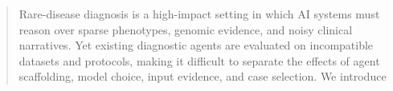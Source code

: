 \documentclass[letterpaper]{article} %
\begin{document}
\begin{abstract}
Rare-disease diagnosis is a high-impact setting in which AI systems must reason over sparse phenotypes, genomic evidence, and noisy clinical narratives. Yet existing diagnostic agents are evaluated on incompatible datasets and protocols, making it difficult to separate the effects of agent scaffolding, model choice, input evidence, and case selection. We introduce

\end{abstract}
\end{document}
